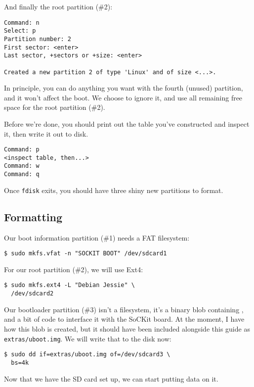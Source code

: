 \documentclass{sockitguide}
\begin{document}
And finally the root partition (\#2):
\begin{verbatim}
Command: n
Select: p
Partition number: 2
First sector: <enter>
Last sector, +sectors or +size: <enter>

Created a new partition 2 of type 'Linux' and of size <...>.
\end{verbatim}

In principle, you can do anything you want with the fourth (unused)
partition, and it won't affect the boot. We choose to ignore it, and use
all remaining free space for the root partition (\#2).

Before we're done, you should print out the table you've constructed and
inspect it, then write it out to disk.
\begin{verbatim}
Command: p
<inspect table, then...>  
Command: w
Command: q
\end{verbatim}

Once \texttt{fdisk} exits, you should have three shiny new partitions
to format.

\subsection{Formatting}

Our boot information partition (\#1) needs a FAT filesystem:
\begin{verbatim}
$ sudo mkfs.vfat -n "SOCKIT BOOT" /dev/sdcard1
\end{verbatim}

For our root partition (\#2), we will use Ext4:
\begin{verbatim}
$ sudo mkfs.ext4 -L "Debian Jessie" \
  /dev/sdcard2
\end{verbatim}

Our bootloader partition (\#3) isn't a filesystem, it's a binary blob
containing \fnurl{U-Boot}{http://www.denx.de/wiki/U-Boot}, and a bit
of code to interface it with the SoCKit board. At the moment, I have
how this blob is created, but it should have been included alongside
this guide as \texttt{extras/uboot.img}. We will write that to the
disk now:
\begin{verbatim}
$ sudo dd if=extras/uboot.img of=/dev/sdcard3 \
  bs=4k
\end{verbatim}

Now that we have the SD card set up, we can start putting data on it.
\end{document}
